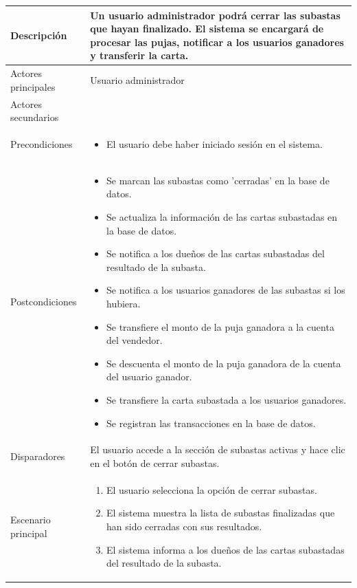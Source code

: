 \begin{longtable}{
    >{\columncolor{lightgreen!20}}p{4cm}
    p{12cm}
    }
    \midrule
    Descripción & Un usuario administrador podrá cerrar las subastas que hayan finalizado. El sistema se encargará de procesar las pujas, notificar a los usuarios ganadores y transferir la carta. \\
    \midrule
    Actores principales & Usuario administrador \\
    \midrule
    Actores secundarios &  \\
    \midrule
    Precondiciones & \begin{itemize}[nosep,leftmargin=*]
        \item El usuario debe haber iniciado sesión en el sistema.
    \end{itemize} \\
    \midrule
    Postcondiciones & 
    \begin{itemize}[nosep,leftmargin=*]
        \item Se marcan las subastas como 'cerradas' en la base de datos.
        \item Se actualiza la información de las cartas subastadas en la base de datos.
        \item Se notifica a los dueños de las cartas subastadas del resultado de la subasta.
        \item Se notifica a los usuarios ganadores de las subastas si los hubiera.
        \item Se transfiere el monto de la puja ganadora a la cuenta del vendedor.
        \item Se descuenta el monto de la puja ganadora de la cuenta del usuario ganador.
        \item Se transfiere la carta subastada a los usuarios ganadores.
        \item Se registran las transacciones en la base de datos.
    \end{itemize} \\
    \midrule
    Disparadores & El usuario accede a la sección de subastas activas y hace clic en el botón de cerrar subastas. \\
    \midrule
    Escenario principal & \begin{enumerate}[nosep,leftmargin=*]
        \item El usuario selecciona la opción de cerrar subastas.
        \item El sistema muestra la lista de subastas finalizadas que han sido cerradas con sus resultados.
        \item El sistema informa a los dueños de las cartas subastadas del resultado de la subasta.

\end{enumerate}
\end{longtable}
